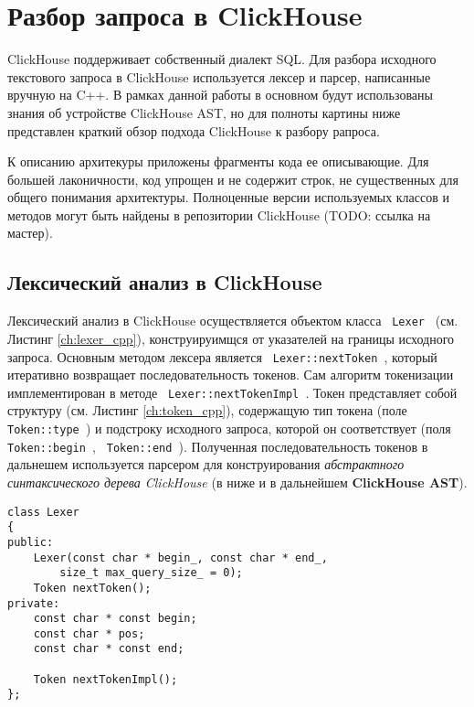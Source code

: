 \section{Разбор запроса в ClickHouse} \label{chap:clickhouse}
ClickHouse поддерживает собственный диалект SQL. Для разбора исходного текстового запроса в ClickHouse используется лексер и парсер, написанные вручную на C++. В рамках данной работы в основном будут использованы знания об устройстве ClickHouse AST, но для полноты картины ниже представлен краткий обзор подхода ClickHouse к разбору рапроса. 

К описанию архитекуры приложены фрагменты кода ее описывающие. Для большей лаконичности, код упрощен и не содержит строк, не существенных для общего понимания архитектуры. Полноценные версии используемых классов и методов могут быть найдены в репозитории ClickHouse (TODO: ссылка на мастер).  

\subsection{Лексический анализ в ClickHouse}

Лексический анализ в ClickHouse осуществляется объектом класса \texttt{ Lexer } (см. Листинг \ref{ch:lexer_cpp}), конструируимщся от указателей на границы исходного запроса. Основным методом лексера является \texttt{ Lexer::nextToken }, который итеративно возвращает последовательность токенов. Сам алгоритм токенизации имплементирован в методе \texttt{ Lexer::nextTokenImpl }. Токен представляет собой структуру (см. Листинг \ref{ch:token_cpp}), содержащую тип токена (поле \texttt{ Token::type }) и подстроку исходного запроса, которой он соответствует (поля \texttt{ Token::begin }, \texttt{ Token::end }). Полученная последовательность токенов в дальнешем используется парсером для конструирования \textit{абстрактного синтаксического дерева ClickHouse} (в ниже и в дальнейшем \textbf{ClickHouse AST}).

\begin{code}
    \label{ch:lexer_cpp}
    \begin{verbatim}
class Lexer
{
public:
    Lexer(const char * begin_, const char * end_,
        size_t max_query_size_ = 0);
    Token nextToken();
private:
    const char * const begin;
    const char * pos;
    const char * const end;

    Token nextTokenImpl();
};
    \end{verbatim}
\end{code}

